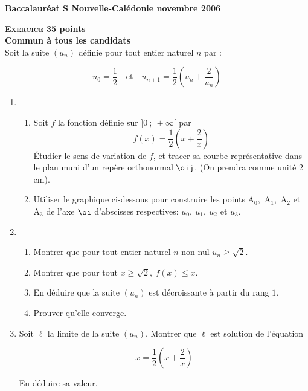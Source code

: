 \begin{exercice}

  \textbf{\gray Baccalaur\'eat S Nouvelle-Cal\'edonie  novembre 2006}
 

\vspace{1ex}


\noindent \textbf{\textsc{Exercice 3}\hfill 5 points}\\
\noindent \textbf{Commun \`a tous les candidats}\\
Soit la suite $\left(u_{n}\right)$ d\' efinie pour tout entier naturel $n$ par :

\[u_{0} = \dfrac{1}{2} \quad \text{et}\quad u_{n+1}	=	\dfrac{1}{2}\left(u_{n} + \dfrac{2}{u_{n}}\right)\]

\begin{enumerate}
\item  \begin{enumerate}
\item  Soit $f$ la fonction d\' efinie sur $]0~;~ +\infty[$ par
\[f(x) = \dfrac{1}{2}\left(x + \dfrac{2}{x}\right)\]
\'Etudier le sens de variation de $f$, et tracer sa courbe repr\' esentative dans le plan muni d'un
rep\`ere orthonormal $\oij$.	(On prendra comme unit\' e 2 cm).

\item Utiliser le graphique ci-dessous pour construire les points
  A$_{0}$,~A$_{1}$,~A$_{2}$ et A$_{3}$ de l'axe $\oi$ 
d'abscisses respectives: $u_{0},~u_{1},~u_{2}$ et $u_{3}$.
\end{enumerate}
\item	\begin{enumerate}
\item  Montrer que pour tout entier naturel $n$ non nul $u_{n} \geqslant \sqrt{2}$.	
\item  Montrer que pour tout $x \geqslant \sqrt{2} ,~ f(x) \leqslant x$.
\item  En d\' eduire que la suite $\left(u_{n}\right)$ est d\' ecroissante \`a partir du rang $1$.
\item  Prouver qu'elle converge.
\end{enumerate}
\item Soit $\ell$ la limite de la suite $\left(u_{n}\right)$. Montrer que $\ell$ est solution de l'\' equation

\[x = \dfrac{1}{2}\left(x + \dfrac{2}{x}\right)\]

En d\' eduire sa valeur.
\end{enumerate}
                          

\end{exercice}

